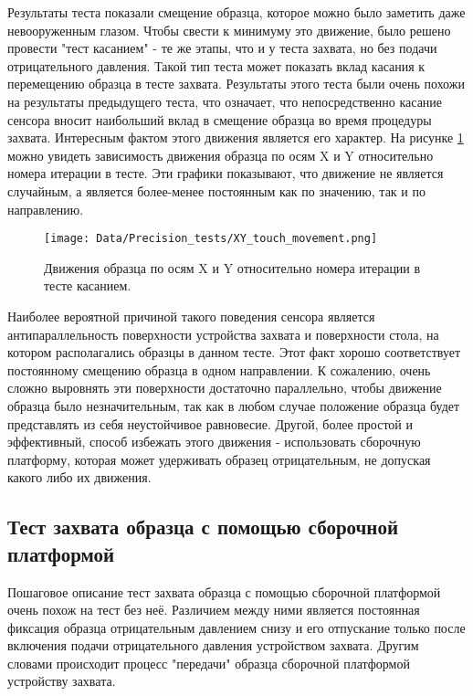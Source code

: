 Результаты теста показали смещение образца, которое можно было заметить даже невооруженным глазом. Чтобы свести к минимуму это движение, было решено провести "тест касанием" - те же этапы, что и у теста захвата, но без подачи отрицательного давления. Такой тип теста может показать вклад касания к перемещению образца в тесте захвата. Результаты этого теста были очень похожи на результаты предыдущего теста, что означает, что непосредственно касание сенсора вносит наибольший вклад в смещение образца во время процедуры захвата. Интересным фактом этого движения является его характер. На рисунке \ref{fig:touch_move} можно увидеть зависимость движения образца по осям X и Y относительно номера итерации в тесте. Эти графики показывают, что движение не является случайным, а является более-менее постоянным как по значению, так и по направлению.

\begin{figure}[ht]\centering
\texttt{[image: Data/Precision\_tests/XY\_touch\_movement.png]}
\caption{Движения образца по осям X и Y относительно номера итерации в тесте касанием.}
\label{fig:touch_move}
\end{figure}

Наиболее вероятной причиной такого поведения сенсора является антипараллельность поверхности устройства захвата и поверхности стола, на котором располагались образцы в данном тесте. Этот факт хорошо соответствует постоянному смещению образца в одном направлении. К сожалению, очень сложно выровнять эти поверхности достаточно параллельно, чтобы движение образца было незначительным, так как в любом случае положение образца будет представлять из себя неустойчивое равновесие. Другой, более простой и эффективный, способ избежать этого движения - использовать сборочную платформу, которая может удерживать образец отрицательным, не допуская какого либо их движения.

\subsection{Тест захвата образца с помощью сборочной платформой}

Пошаговое описание тест захвата образца с помощью сборочной платформой очень похож на тест без неё. Различием между ними является постоянная фиксация образца отрицательным давлением снизу и его отпускание только после включения подачи отрицательного давления устройством захвата. Другим словами происходит процесс "передачи" образца сборочной платформой устройству захвата. 

